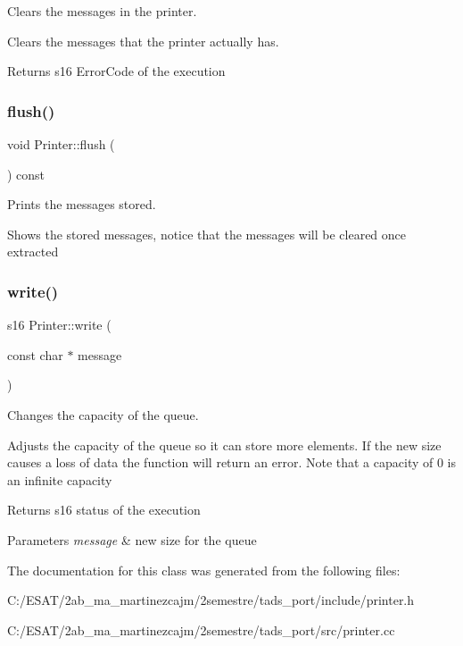 Clears the messages in the printer. 

Clears the messages that the printer actually has.

\begin{DoxyReturn}{Returns}
s16 Error\+Code of the execution 
\end{DoxyReturn}
\mbox{\label{class_printer_ab16ea56023ef4f1d2d3a5a18651f0ae9}} 
\subsubsection{\texorpdfstring{flush()}{flush()}}
{\footnotesize\ttfamily void Printer\+::flush (\begin{DoxyParamCaption}{ }\end{DoxyParamCaption}) const}



Prints the messages stored. 

Shows the stored messages, notice that the messages will be cleared once extracted \mbox{\label{class_printer_a3c089dbcfb957de33f01bd3691bb75d6}} 
\subsubsection{\texorpdfstring{write()}{write()}}
{\footnotesize\ttfamily s16 Printer\+::write (\begin{DoxyParamCaption}\item[{const char $\ast$}]{message }\end{DoxyParamCaption})}



Changes the capacity of the queue. 

Adjusts the capacity of the queue so it can store more elements. If the new size causes a loss of data the function will return an error. Note that a capacity of 0 is an infinite capacity

\begin{DoxyReturn}{Returns}
s16 status of the execution 
\end{DoxyReturn}

\begin{DoxyParams}{Parameters}
{\em message} & new size for the queue \\
\hline
\end{DoxyParams}


The documentation for this class was generated from the following files\+:\begin{DoxyCompactItemize}
\item 
C\+:/\+E\+S\+A\+T/2ab\+\_\+ma\+\_\+martinezcajm/2semestre/tads\+\_\+port/include/printer.\+h\item 
C\+:/\+E\+S\+A\+T/2ab\+\_\+ma\+\_\+martinezcajm/2semestre/tads\+\_\+port/src/printer.\+cc\end{DoxyCompactItemize}
